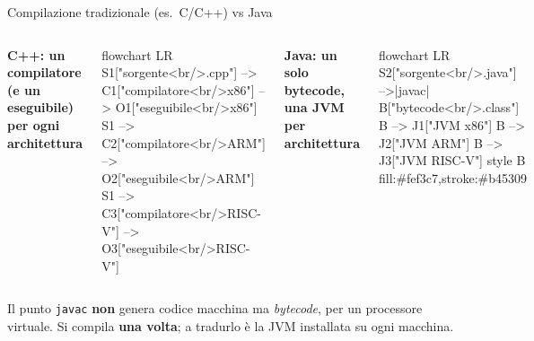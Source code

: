 \documentclass[10pt,aspectratio=169]{beamer}
\begin{document}
\begin{frame}[fragile]{Compilazione tradizionale (es.\ C/C++) vs Java}
\begin{columns}[T]
\centering\textbf{C++: un compilatore (e un eseguibile) per ogni architettura}
\begin{mermaid}
flowchart LR
  S1["sorgente<br/>.cpp"] --> C1["compilatore<br/>x86"] --> O1["eseguibile<br/>x86"]
  S1 --> C2["compilatore<br/>ARM"] --> O2["eseguibile<br/>ARM"]
  S1 --> C3["compilatore<br/>RISC-V"] --> O3["eseguibile<br/>RISC-V"]
\end{mermaid}

\centering\textbf{Java: un solo bytecode, una JVM per architettura}
\begin{mermaid}
flowchart LR
  S2["sorgente<br/>.java"] -->|javac| B["bytecode<br/>.class"]
  B --> J1["JVM x86"]
  B --> J2["JVM ARM"]
  B --> J3["JVM RISC-V"]
  style B fill:#fef3c7,stroke:#b45309
\end{mermaid}
\end{columns}

\vspace{0.3cm}
\begin{block}{Il punto}
\texttt{javac} \textbf{non} genera codice macchina ma \emph{bytecode}, per un processore virtuale. Si compila \textbf{una volta}; a tradurlo è la JVM installata su ogni macchina.
\end{block}
\end{frame}
\end{document}
